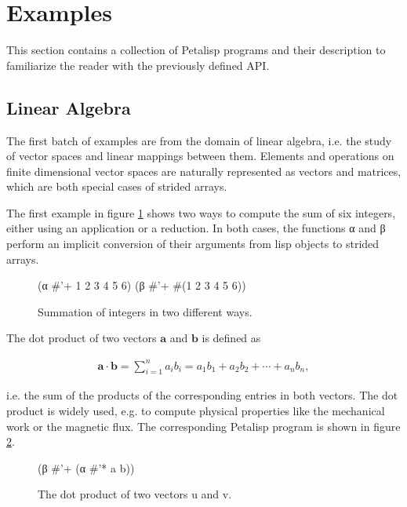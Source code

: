 \section{Examples}
\label{sec:examples}

This section contains a collection of Petalisp programs and their
description to familiarize the reader with the previously defined
API.

\subsection{Linear Algebra}

The first batch of examples are from the domain of linear algebra, i.e. the
study of vector spaces and linear mappings between them. Elements and
operations on finite dimensional vector spaces are naturally represented as
vectors and matrices, which are both special cases of strided arrays.

The first example in figure \ref{fig:summation} shows two ways to compute
the sum of six integers, either using an application or a reduction. In
both cases, the functions α and β perform an implicit conversion of their
arguments from lisp objects to strided arrays.

\begin{figure}[h]
\resetlinenumber
\begin{code}
(α #'+ 1 2 3 4 5 6)
(β #'+ #(1 2 3 4 5 6))
\end{code}
\caption{Summation of integers in two different ways.}
\label{fig:summation}
\end{figure}

The dot product of two vectors $\mathbf{a}$ and $\mathbf{b}$ is defined as

\begin{align}
{ \mathbf {a} \cdot \mathbf {b} =\sum _{i=1}^{n}a_{i}b_{i}=a_{1}b_{1}+a_{2}b_{2}+\cdots +a_{n}b_{n}},
\end{align}

i.e. the sum of the products of the corresponding entries in both
vectors. The dot product is widely used, e.g. to compute physical
properties like the mechanical work or the magnetic flux. The corresponding
Petalisp program is shown in figure \ref{fig:dotproduct}.

\begin{figure}[h]
\resetlinenumber
\begin{code}
(β #'+ (α #'* a b))
\end{code}
\caption{The dot product of two vectors u and v.}
\label{fig:dotproduct}
\end{figure}

